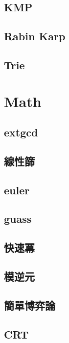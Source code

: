     \subsection{KMP}
        
    \subsection{Rabin Karp}
        
    \subsection{Trie}
        

\section{Math}
	\subsection{extgcd}
		
    \subsection{線性篩}
		
    \subsection{euler}
		    
    \subsection{guass}
		
    \subsection{快速冪}
		
    \subsection{模逆元}
		
    \subsection{簡單博弈論}
		
    \subsection{CRT}
        
